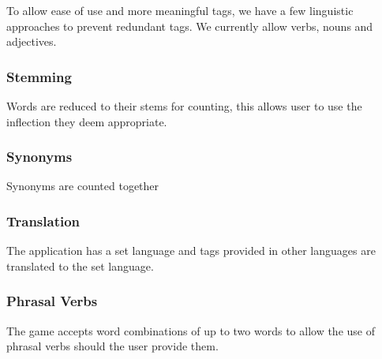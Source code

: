 To allow ease of use and more meaningful tags, we have a few linguistic approaches to prevent redundant tags. We currently allow verbs, nouns and adjectives.



\subsubsection{Stemming}
Words are reduced to their stems for counting, this allows user to use the inflection they deem appropriate.


\subsubsection{Synonyms}
Synonyms are counted together


\subsubsection{Translation}
The application has a set language and tags provided in other languages are translated to the set language.


\subsubsection{Phrasal Verbs}
The game accepts word combinations of up to two words to allow the use of phrasal verbs should the user provide them.


